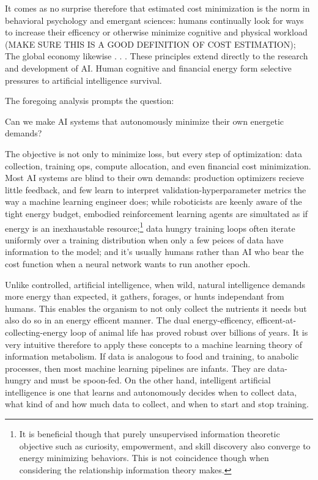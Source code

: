 It comes as no surprise therefore that estimated cost minimization is the norm in behavioral psychology and emergant sciences: humans continually look for ways to increase their efficency or otherwise minimize cognitive and physical workload (MAKE SURE THIS IS A GOOD DEFINITION OF COST ESTIMATION); The global economy likewise . . . These principles extend directly to the research and development of AI. Human cognitive and financial energy form selective pressures to artificial intelligence survival.

The foregoing analysis prompts the question:

\begin{center}
Can we make AI systems that autonomously minimize their own energetic demands?
\end{center}

The objective is not only to minimize loss, but every step of optimization: data collection, training ops, compute allocation, and even financial cost minimization. Most AI systems are blind to their own demands: production optimizers recieve little feedback, and few learn to interpret validation-hyperparameter metrics the way a machine learning engineer does; while roboticists are keenly aware of the  tight energy budget, embodied reinforcement learning agents are simultated as if energy is an inexhaustable resource;\footnote{It is beneficial though that purely unsupervised information theoretic objective such as curiosity, empowerment, and skill discovery also converge to energy minimizing behaviors. This is not coincidence though when considering the relationship information theory makes.} data hungry training loops often iterate uniformly over a training distribution when only a few peices of data have information to the model; and it's usually humans rather than AI who bear the cost function when a neural network wants to run another epoch. 

Unlike controlled, artificial intelligence, when wild, natural intelligence demands more energy than expected, it gathers, forages, or hunts independant from humans. This enables the organism to not only collect the nutrients it needs but also do so in an energy efficent manner. The dual energy-efficency, efficent-at-collecting-energy loop of animal life has proved robust over billions of years. It is very intuitive therefore to apply these concepts to a machine learning theory of information metabolism. If data is analogous to food and training, to anabolic processes, then most machine learning pipelines are infants. They are data-hungry and must be spoon-fed. On the other hand, intelligent artificial intelligence is one that learns and autonomously decides when to collect data, what kind of and how much data to collect, and when to start and stop training. 

